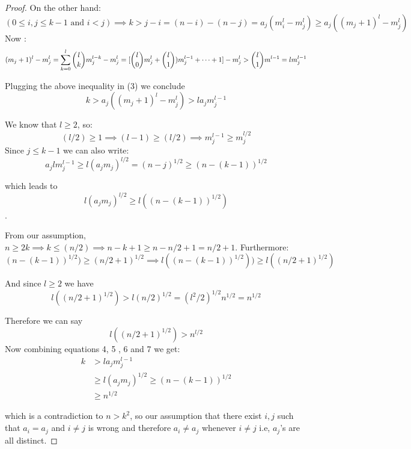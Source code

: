 \documentclass[a4paper]{article}
\begin{document}
\begin{proof}
  
On the other hand: 
\begin{equation}
(0 \leq i,j \leq k-1 \text{  and  } i<j )\implies k > j-i = (n-i)-(n-j) = a_j(m_i^l - m_j^l) \geq a_j((m_j+1)^l-m_j^l) 
\end{equation}
Now :
$$
(m_j+1)^l- m_{j}^l = \sum_{k=0}^{l} {l \choose k} m_j^{l-k}-m_{j}^l= [{l\choose 0}m_{j}^l+{l\choose 1})m_{j}^{l-1}+ \dots +1] -m_{j}^l\\
 > {l \choose 1}m^{l-1}= lm_{j}^{l-1}$$
 
 Plugging the above inequality in (3) we conclude
 \begin{equation}
 k>a_j((m_j+1)^l-m_j^l)>la_{j}m_{j}^{l-1}
 \end{equation}


We know that $l \geq 2$, so:
\begin {equation*}
  (l/2) \geq 1 \implies (l-1)\geq (l/2) \implies m_j^{l-1} \geq m_j^{l/2} 
\end{equation*}
Since $j\leq k-1$ we can also write: 
\begin{equation*}
a_j lm_j^{l-1} \geq l(a_j m_j)^{l/2}= (n-j)^{1/2} \geq (n-(k-1))^{1/2} 
\end{equation*}

which leads to \begin{equation}l(a_j m_j)^{l/2} \geq l((n-(k-1))^{1/2}) \end {equation}. 

From our assumption, $n \geq 2k \implies k \leq (n/2)\implies n-k+1 \geq n-n/2 +1 = n/2 +1$. Furthermore: 
\begin{equation}
(n-(k-1))^{1/2}) \geq (n/2 +1)^{1/2} \implies l((n-(k-1))^{1/2})) \geq l((n/2 +1)^{1/2})
\end{equation}

And since $l\geq 2$ we have $$l((n/2 +1)^{1/2}) > l (n/2)^{1/2} = (l^2 / 2)^{1/2} n^{1/2} = n^{1/2}$$

Therefore we can say 
\begin{equation}
l((n/2 +1)^{1/2}) > n^{l/2}
\end{equation}
 Now combining equations 4, 5 , 6 and 7 we get:
 \begin{align*}
 k&>la_{j}m_{j}^{l-1}\\
 & \geq l{(a_{j}m_{j})}^{1/2}\geq {(n-(k-1))}^{1/2}\\
 &\geq n^{1/2}
 \end{align*}

which is a contradiction to $n>k^2$, so our assumption that there exist  $ i, j$  such that $a_i = a_j$ and $i \neq j$ is wrong and therefore  $a_i \neq a_j$ whenever $i \neq j$ i.e, $a_{j}$'s are all distinct.


\end{proof}
\end{document}

